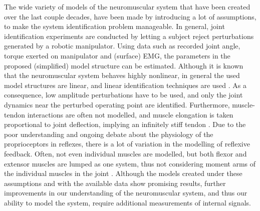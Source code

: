 The wide variety of models of the neuromuscular system that have been created over the last couple decades, have been made by introducing a lot of assumptions, to make the system identification problem manageable. In general, joint identification experiments are conducted by letting a subject reject perturbations generated by a robotic manipulator. Using data such as recorded joint angle, torque exerted on manipulator and (surface) EMG, the parameters in the proposed (simplified) model structure can be estimated. Although it is known that the neuromuscular system behaves highly nonlinear, in general the used model structures are linear, and linear identification techniques are used \cite{van_der_helm_identification_2002, schouten_nmclab_2008, mugge_rigorous_2010}. As a consequence, low amplitude perturbations have to be used, and only the joint dynamics near the perturbed operating point are identified. Furthermore, muscle-tendon interactions are often not modelled, and muscle elongation is taken proportional to joint deflection, implying an infinitely stiff tendon \cite{zhang_simultaneous_1997, mirbagheri_intrinsic_2000, van_der_helm_identification_2002}. Due to the poor understanding and ongoing debate about the physiology of the proprioceptors in reflexes, there is a lot of variation in the modelling of reflexive feedback. Often, not even individual muscles are modelled, but both flexor and extensor muscles are lumped as one system, thus not considering moment arms of the individual muscles in the joint \cite{zhang_simultaneous_1997,mirbagheri_intrinsic_2000,kearney_identification_1997,van_der_helm_identification_2002,schouten_nmclab_2008,mugge_rigorous_2010}. 
Although the models created under these assumptions and with the available data show promising results, further improvements in our understanding of the neuromuscular system, and thus our ability to model the system, require additional measurements of internal signals. 

